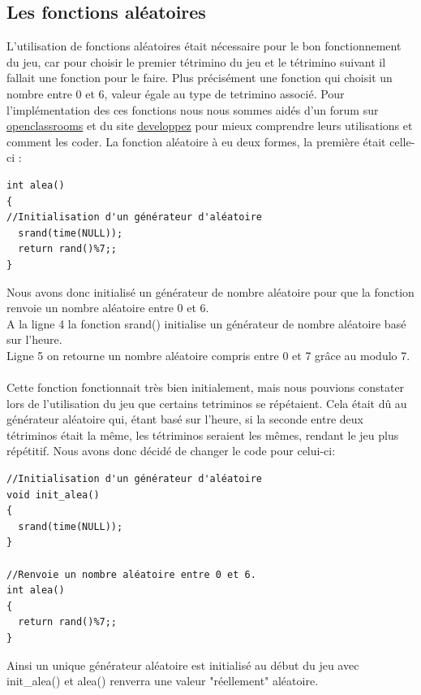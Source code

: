 \documentclass[a4paper,10p]{report}
\begin{document}
\subsection{Les fonctions aléatoires}
\label{alea}
\label{init_alea}
L'utilisation de fonctions aléatoires était nécessaire pour le bon fonctionnement du jeu, car pour choisir le premier tétrimino du jeu et le tétrimino suivant il fallait une fonction pour le faire. Plus précisément une fonction qui choisit un nombre entre 0 et 6, valeur égale au type de tetrimino associé. Pour l'implémentation des ces fonctions nous nous sommes aidés d'un forum sur \href{https://openclassrooms.com/forum/sujet/generateur-de-nombre-aleatoire-entre-1-et-9}{openclassrooms} et du site \href{https://nicolasj.developpez.com/articles/libc/hasard/}{developpez} pour mieux comprendre leurs utilisations et comment les coder.
La fonction aléatoire à eu deux formes, la première était celle-ci :
\begin{lstlisting}
int alea()
{
//Initialisation d'un générateur d'aléatoire
  srand(time(NULL));
  return rand()%7;;
}
\end{lstlisting}
Nous avons donc initialisé un générateur de nombre aléatoire pour que la fonction renvoie un nombre aléatoire entre 0 et 6.
\\ A la ligne \textcolor{gris}{4} la fonction srand() initialise un générateur de nombre aléatoire basé sur l'heure.
\\Ligne \textcolor{gris}{5} on retourne un nombre aléatoire compris entre 0 et 7 grâce au modulo 7.
\\\\
Cette fonction fonctionnait très bien initialement, mais nous pouvions constater lors de l'utilisation du jeu que certains tetriminos se répétaient. Cela était dû au générateur aléatoire qui, étant basé sur l'heure, si la seconde entre deux tétriminos était la même, les tétriminos seraient les mêmes, rendant le jeu plus répétitif. Nous avons donc décidé de changer le code pour celui-ci:
\begin{lstlisting}
//Initialisation d'un générateur d'aléatoire
void init_alea()
{
  srand(time(NULL));
}

//Renvoie un nombre aléatoire entre 0 et 6.
int alea()
{
  return rand()%7;;
}
\end{lstlisting}
Ainsi un unique générateur aléatoire est initialisé au début du jeu avec init\_alea() et alea() renverra une valeur "réellement" aléatoire.
\end{document}
